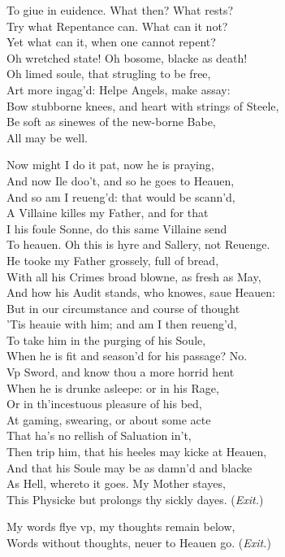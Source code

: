 \documentclass[a5paper,DIV=calc,11pt]{scrbook}
\begin{document}
\begin{drama*}
    To giue in euidence. What then? What rests?\\
    Try what Repentance can. What can it not?\\
    Yet what can it, when one cannot repent?\\
    Oh wretched state! Oh bosome, blacke as death!\\
    Oh limed soule, that strugling to be free,\\
    Art more ingag'd: Helpe Angels, make assay:\\
    Bow stubborne knees, and heart with strings of Steele,\\
    Be soft as sinewes of the new-borne Babe,\\
    All may be well.
    
    
    \hamspeaks Now might I do it pat, now he is praying,\\
    And now Ile doo't, and so he goes to Heauen,\\
    And so am I reueng'd: that would be scann'd,\\
    A Villaine killes my Father, and for that\\
    I his foule Sonne, do this same Villaine send\\
    To heauen. Oh this is hyre and Sallery, not Reuenge.\\
    He tooke my Father grossely, full of bread,\\
    With all his Crimes broad blowne, as fresh as May,\\
    And how his Audit stands, who knowes, saue Heauen:\\
    But in our circumstance and course of thought\\
    'Tis heauie with him; and am I then reueng'd,\\
    To take him in the purging of his Soule,\\
    When he is fit and season'd for his passage? No.\\
    Vp Sword, and know thou a more horrid hent\\
    When he is drunke asleepe: or in his Rage,\\
    Or in th'incestuous pleasure of his bed,\\
    At gaming, swearing, or about some acte\\
    That ha's no rellish of Saluation in't,\\
    Then trip him, that his heeles may kicke at Heauen,\\
    And that his Soule may be as damn'd and blacke\\
    As Hell, whereto it goes. My Mother stayes,\\
    This Physicke but prolongs thy sickly dayes. \hfill(\textit{Exit.})
    
    \kingspeaks My words flye vp, my thoughts remain below,\\
    Words without thoughts, neuer to Heauen go. \hfill(\textit{Exit.})
\end{drama*}
\end{document}

